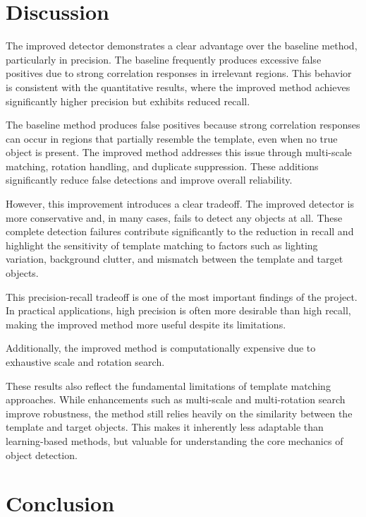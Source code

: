 \documentclass[11pt, letterpaper, twoside]{article}
\begin{document}
\FloatBarrier

\section{Discussion}

The improved detector demonstrates a clear advantage over the baseline method, particularly in precision. The baseline frequently produces excessive false positives due to strong correlation responses in irrelevant regions. This behavior is consistent with the quantitative results, where the improved method achieves significantly higher precision but exhibits reduced recall.

The baseline method produces false positives because strong correlation responses can occur in regions that partially resemble the template, even when no true object is present. The improved method addresses this issue through multi-scale matching, rotation handling, and duplicate suppression. These additions significantly reduce false detections and improve overall reliability. 

However, this improvement introduces a clear tradeoff. The improved detector is more conservative and, in many cases, fails to detect any objects at all. These complete detection failures contribute significantly to the reduction in recall and highlight the sensitivity of template matching to factors such as lighting variation, background clutter, and mismatch between the template and target objects.

This precision-recall tradeoff is one of the most important findings of the project. In practical applications, high precision is often more desirable than high recall, making the improved method more useful despite its limitations.

Additionally, the improved method is computationally expensive due to exhaustive scale and rotation search.

These results also reflect the fundamental limitations of template matching approaches. While enhancements such as multi-scale and multi-rotation search improve robustness, the method still relies heavily on the similarity between the template and target objects. This makes it inherently less adaptable than learning-based methods, but valuable for understanding the core mechanics of object detection.

\section{Conclusion}
\end{document}
